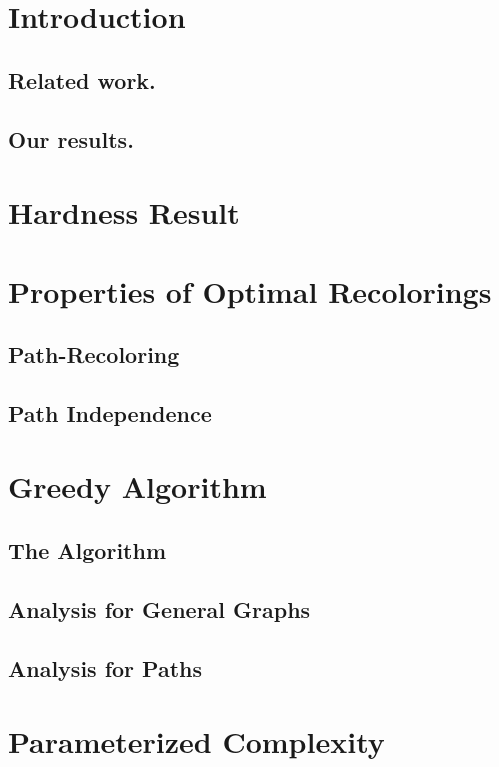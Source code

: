 \section{Introduction}

	\subsection*{Related work.}
	
	\subsection*{Our results.}
	
\section{Hardness Result}


\section{Properties of Optimal Recolorings}

	\subsection{Path-Recoloring}

	\subsection{Path Independence}


\section{Greedy Algorithm}
	
	\subsection{The Algorithm}
	
	\subsection{Analysis for General Graphs}
	
	\subsection{Analysis for Paths}

\section{Parameterized Complexity}
